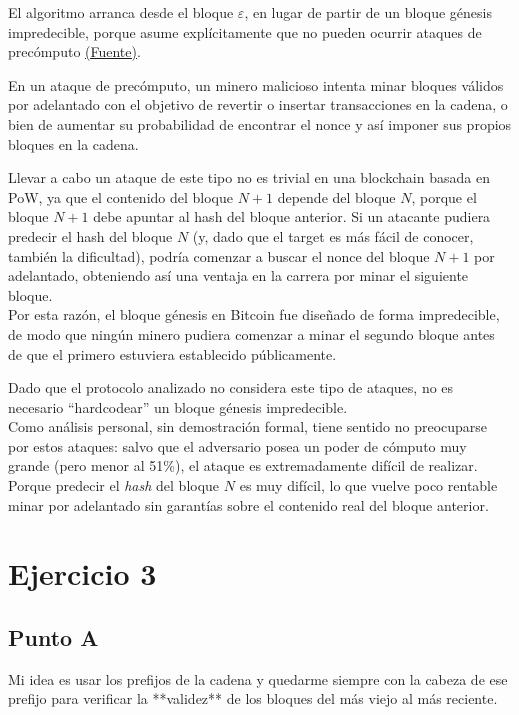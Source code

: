 \documentclass[12pt]{article}
\begin{document}
El algoritmo arranca desde el bloque $\varepsilon$, en lugar de partir de un bloque génesis impredecible, porque asume explícitamente que no pueden ocurrir ataques de pre\-cómputo \href{https://dl.acm.org/doi/10.1145/3653445#fn13}{(Fuente)}.

En un ataque de pre\-cómputo, un minero malicioso intenta minar bloques válidos por adelantado con el objetivo de revertir o insertar transacciones en la cadena, o bien de aumentar su probabilidad de encontrar el nonce y así imponer sus propios bloques en la cadena.

Llevar a cabo un ataque de este tipo no es trivial en una blockchain basada en PoW, ya que el contenido del bloque $N+1$ depende del bloque $N$, porque el bloque $N+1$ debe apuntar al hash del bloque anterior. 
Si un atacante pudiera predecir el hash del bloque $N$ (y, dado que el target es más fácil de conocer, también la dificultad), podría comenzar a buscar el nonce del bloque $N+1$ por adelantado, obteniendo así una ventaja en la carrera por minar el siguiente bloque. \\

Por esta razón, el bloque génesis en Bitcoin fue diseñado de forma impredecible, de modo que ningún minero pudiera comenzar a minar el segundo bloque antes de que el primero estuviera establecido públicamente.

Dado que el protocolo analizado no considera este tipo de ataques, no es necesario ``hardcodear'' un bloque génesis impredecible. \\

Como análisis personal, sin demostración formal, tiene sentido no preocuparse por estos ataques: salvo que el adversario posea un poder de cómputo muy grande (pero menor al 51\%), el ataque es extremadamente difícil de realizar. 
Porque predecir el \textit{hash} del bloque $N$ es muy difícil, lo que vuelve poco rentable minar por adelantado sin garantías sobre el contenido real del bloque anterior.

\section*{Ejercicio 3}

\subsection*{Punto A}

Mi idea es usar los prefijos de la cadena y quedarme siempre con la cabeza de ese prefijo para verificar la **validez** de los bloques del más viejo al más reciente.  
\end{document}
